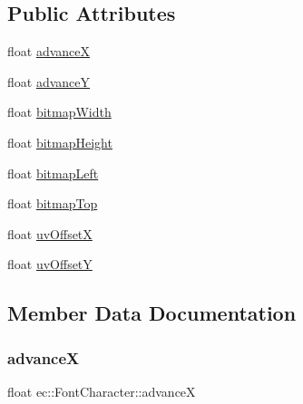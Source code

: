 \subsection*{Public Attributes}
\begin{DoxyCompactItemize}
\item 
float \mbox{\hyperlink{structec_1_1_font_character_ab8a3c661e44684fa2fc1321bae77c4b9}{advanceX}}
\item 
float \mbox{\hyperlink{structec_1_1_font_character_a5f47492159b809279b746dea893d1a69}{advanceY}}
\item 
float \mbox{\hyperlink{structec_1_1_font_character_aa6f9dffb9e54ff8b61c452349eafc156}{bitmap\+Width}}
\item 
float \mbox{\hyperlink{structec_1_1_font_character_aa8ceecfdaf18e6d3567074a35c04580d}{bitmap\+Height}}
\item 
float \mbox{\hyperlink{structec_1_1_font_character_a70c91f359e600a1fd27a1226e5a2f11a}{bitmap\+Left}}
\item 
float \mbox{\hyperlink{structec_1_1_font_character_aa068487929132785521934ddc35da8eb}{bitmap\+Top}}
\item 
float \mbox{\hyperlink{structec_1_1_font_character_a808bd1f1774bbbb21bd845f6868dcacc}{uv\+OffsetX}}
\item 
float \mbox{\hyperlink{structec_1_1_font_character_a6135b99b5b442227b3dec5974f7d6a90}{uv\+OffsetY}}
\end{DoxyCompactItemize}


\subsection{Member Data Documentation}
\mbox{\label{structec_1_1_font_character_ab8a3c661e44684fa2fc1321bae77c4b9}} 
\subsubsection{\texorpdfstring{advanceX}{advanceX}}
{\footnotesize\ttfamily float ec\+::\+Font\+Character\+::advanceX}

\mbox{\label{structec_1_1_font_character_a5f47492159b809279b746dea893d1a69}} 
